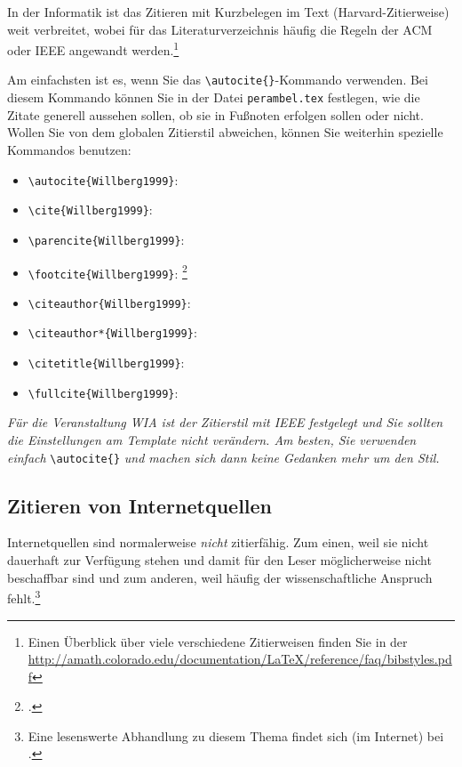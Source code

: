 \documentclass[conference,compsoc,final,a4paper]{IEEEtran}
\begin{document}
In der Informatik ist das Zitieren mit Kurzbelegen im Text (Harvard-Zitierweise) weit verbreitet, wobei für das Literaturverzeichnis häufig die Regeln der \acs{ACM} oder \acs{IEEE} angewandt werden.\footnote{Einen Überblick über viele verschiedene Zitierweisen finden Sie in der \url{http://amath.colorado.edu/documentation/LaTeX/reference/faq/bibstyles.pdf}}

Am einfachsten ist es, wenn Sie das \lstinline+\autocite{}+-Kommando verwenden. Bei diesem Kommando können Sie in der Datei \texttt{perambel.tex} festlegen, wie die Zitate generell aussehen sollen, \zb ob sie in Fußnoten erfolgen sollen oder nicht. Wollen Sie von dem globalen Zitierstil abweichen, können Sie weiterhin spezielle Kommandos benutzen:

\begin{itemize}
	\item \lstinline+\autocite{Willberg1999}+: \autocite{Willberg1999}
	\item \lstinline+\cite{Willberg1999}+: \cite{Willberg1999}
	\item \lstinline+\parencite{Willberg1999}+: \parencite{Willberg1999}
	\item \lstinline+\footcite{Willberg1999}+: \footcite{Willberg1999}
	\item \lstinline+\citeauthor{Willberg1999}+: \citeauthor{Willberg1999}
	\item \lstinline+\citeauthor*{Willberg1999}+: \citeauthor*{Willberg1999}
	\item \lstinline++: \citetitle{Willberg1999}
	\item \lstinline++: \fullcite{Willberg1999}
\end{itemize}

\textit{Für die Veranstaltung WIA ist der Zitierstil mit IEEE festgelegt und Sie sollten die Einstellungen am Template nicht verändern. Am besten, Sie verwenden einfach}  \lstinline+\autocite{}+ \textit{und machen sich dann keine Gedanken mehr um den Stil.}

\subsection{Zitieren von Internetquellen}
Internetquellen sind normalerweise \textit{nicht} zitierfähig. Zum einen, weil sie nicht dauerhaft zur Verfügung stehen und damit für den Leser möglicherweise nicht beschaffbar sind und zum anderen, weil häufig der wissenschaftliche Anspruch fehlt.\footnote{Eine lesenswerte Abhandlung zu diesem Thema findet sich (im Internet) bei \autocite{Weber2006}.}
\end{document}
